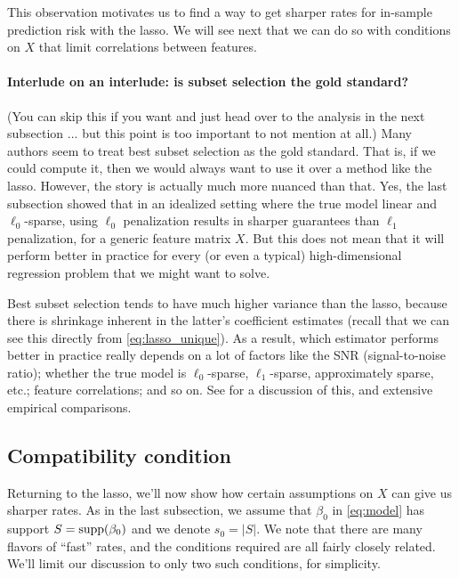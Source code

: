 \documentclass{article}
\begin{document}
This observation motivates us to find a way to get sharper rates for in-sample
prediction risk with the lasso. We will see next that we can do so with
conditions on $X$ that limit correlations between features.  

\paragraph{Interlude on an interlude: is subset selection the gold standard?} 

(You can skip this if you want and just head over to the analysis in the next
subsection ... but this point is too important to not mention at all.) Many
authors seem to treat best subset selection as the gold standard. That is, if we
could compute it, then we would always want to use it over a method like the
lasso. However, the story is actually much more nuanced than that. Yes, the last 
subsection showed that in an idealized setting where the true model linear
and $\ell_0$-sparse, using $\ell_0$ penalization results in sharper guarantees
than $\ell_1$ penalization, for a generic feature matrix $X$. But this does not
mean that it will perform better in practice for every (or even a typical)
high-dimensional regression problem that we might want to solve. 

Best subset selection tends to have much higher variance than the lasso, because
there is shrinkage inherent in the latter's coefficient estimates (recall that
we can see this directly from \eqref{eq:lasso_unique}). As a result, which
estimator performs better in practice really depends on a lot of factors like
the SNR (signal-to-noise ratio); whether the true model is $\ell_0$-sparse, 
$\ell_1$-sparse, approximately sparse, etc.; feature correlations; and so
on. See \citet{hastie2020best} for a discussion of this, and extensive empirical  
comparisons.    

\subsection{Compatibility condition}

Returning to the lasso, we'll now show how certain assumptions on $X$ can give
us sharper rates. As in the last subsection, we assume that $\beta_0$ in
\eqref{eq:model} has support $S = \mathrm{supp}(\beta_0)$ and we denote $s_0 =
|S|$. We note that there are many flavors of ``fast'' rates, and the conditions
required are all fairly closely related. We'll limit our discussion to only two
such conditions, for simplicity.     
\end{document}
